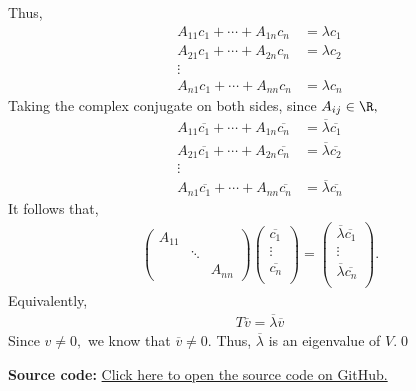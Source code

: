 \documentclass{amsart}
\newcommand{\pagenum}{140}
\newcommand{\probnum}{16}
\begin{document}
Thus,
\begin{align*}
    A_{11}c_1+\cdots+A_{1n}c_n&=\lambda c_1\\
    A_{21}c_1+\cdots+A_{2n}c_n&=\lambda c_2\\
    \vdots\\
    A_{n1}c_1+\cdots+A_{nn}c_n&=\lambda c_n
\end{align*}
Taking the complex conjugate on both sides, since $A_{ij}\in\R,$
\begin{align*}
    A_{11}\overline{c_1}+\cdots+A_{1n}\overline{c_n}&=\overline{\lambda}\overline{c_1}\\
    A_{21}\overline{c_1}+\cdots+A_{2n}\overline{c_n}&=\overline{\lambda}\overline{c_2}\\
    \vdots\\
    A_{n1}\overline{c_1}+\cdots+A_{nn}\overline{c_n}&=\overline{\lambda}\overline{c_n}
\end{align*}
It follows that,
\begin{align*}
    \begin{pmatrix}
        A_{11} & & \\
               & \ddots & \\
               & & A_{nn}
    \end{pmatrix}\begin{pmatrix}
        \overline{c_1}\\
        \vdots\\
        \overline{c_n}\\
    \end{pmatrix}
    =\begin{pmatrix}
        \overline{\lambda}\overline{c_1}\\
        \vdots\\
        \overline{\lambda}\overline{c_n}\\
    \end{pmatrix}.
\end{align*}
Equivalently,
\begin{align*}
    T\overline v=\overline\lambda\overline v
\end{align*}
Since $v\ne0,$ we know that $\overline v\ne 0.$ Thus, $\overline\lambda$
is an eigenvalue of $V$.\qed

\vspace{0.5in}

\textbf{Source code:} \href{https://github.com/thomasbreydo/linalg/\pagenum_\probnum_Thomas_Breydo.tex}
{Click here to open the source code on GitHub.}
\end{document}
